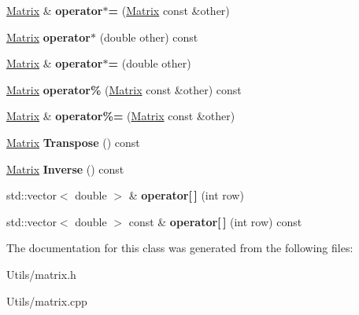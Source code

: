\begin{DoxyCompactItemize}
\hyperlink{classMatrix}{Matrix} \& {\bfseries operator$\ast$=} (\hyperlink{classMatrix}{Matrix} const \&other)
\item 
\mbox{\label{classMatrix_afdd6cdea30961d5ce34be67332c1d0dd}} 
\hyperlink{classMatrix}{Matrix} {\bfseries operator$\ast$} (double other) const
\item 
\mbox{\label{classMatrix_ad2fd5772e288eb07a404907e6e1a1dd6}} 
\hyperlink{classMatrix}{Matrix} \& {\bfseries operator$\ast$=} (double other)
\item 
\mbox{\label{classMatrix_aef843067e6c43218c7c909b6367706c2}} 
\hyperlink{classMatrix}{Matrix} {\bfseries operator\%} (\hyperlink{classMatrix}{Matrix} const \&other) const
\item 
\mbox{\label{classMatrix_ac391b0910e9f0fc0a6e23c9346cee2ad}} 
\hyperlink{classMatrix}{Matrix} \& {\bfseries operator\%=} (\hyperlink{classMatrix}{Matrix} const \&other)
\item 
\mbox{\label{classMatrix_ad0c96cdea0d2ae3403653ca90aa70796}} 
\hyperlink{classMatrix}{Matrix} {\bfseries Transpose} () const
\item 
\mbox{\label{classMatrix_ad5f101877c4a10988bf7f128a9c248d8}} 
\hyperlink{classMatrix}{Matrix} {\bfseries Inverse} () const
\item 
\mbox{\label{classMatrix_a25cb20c90560327240a07d81ed11c746}} 
std\+::vector$<$ double $>$ \& {\bfseries operator\mbox{[}$\,$\mbox{]}} (int row)
\item 
\mbox{\label{classMatrix_a120efaa8b3a945230e8a601927cb0e47}} 
std\+::vector$<$ double $>$ const  \& {\bfseries operator\mbox{[}$\,$\mbox{]}} (int row) const
\end{DoxyCompactItemize}


The documentation for this class was generated from the following files\+:\begin{DoxyCompactItemize}
\item 
Utils/matrix.\+h\item 
Utils/matrix.\+cpp\end{DoxyCompactItemize}
